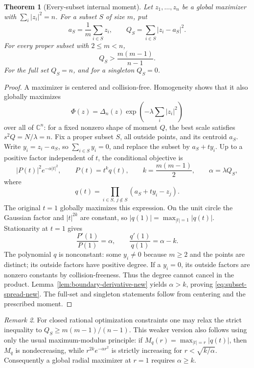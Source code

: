 \documentclass[11pt]{article}
\newtheorem{theorem}{Theorem}[section]
\theoremstyle{remark}
\newtheorem{remark}[theorem]{Remark}
\newcommand{\C}{\mathbb C}
\numberwithin{equation}{section}
\begin{document}
\begin{theorem}[Every-subset internal moment]\label{thm:subset-spread-new}
Let $z_1,\ldots,z_n$ be a global maximizer with
$\sum_i|z_i|^2=n$. For a subset $S$ of size $m$, put
\[
 a_S=\frac1m\sum_{i\in S}z_i,\qquad
 Q_S=\sum_{i\in S}|z_i-a_S|^2.
\]
For every proper subset with $2\le m<n$,
\begin{equation}\label{eq:subset-spread-new}
             Q_S>\frac{m(m-1)}{n-1}.
\end{equation}
For the full set $Q_S=n$, and for a singleton $Q_S=0$.
\end{theorem}
\begin{proof}
A maximizer is centered and collision-free. Homogeneity shows that it
also globally maximizes
\[
 \Phi(z)=\Delta_n(z)\exp\left(-\lambda\sum_i|z_i|^2\right)
\]
over all of $\C^n$: for a fixed nonzero shape of moment $Q$, the best
scale satisfies $s^2Q=N/\lambda=n$.
Fix a proper subset $S$, all outside points, and its centroid $a_S$.
Write $y_i=z_i-a_S$, so $\sum_{i\in S}y_i=0$, and replace the subset
by $a_S+t y_i$. Up to a positive factor independent of $t$, the
conditional objective is
\[
 |P(t)|^2e^{-\alpha|t|^2},\qquad
 P(t)=t^k q(t),\qquad k=\frac{m(m-1)}2,\qquad
 \alpha=\lambda Q_S,
\]
where
\[
 q(t)=\prod_{i\in S,\ j\notin S}(a_S+t y_i-z_j).
\]
The original $t=1$ globally maximizes this expression. On the unit
circle the Gaussian factor and $|t|^{2k}$ are constant, so
$|q(1)|=\max_{|t|=1}|q(t)|$. Stationarity at $t=1$ gives
\[
 \frac{P'(1)}{P(1)}=\alpha,
 \qquad \frac{q'(1)}{q(1)}=\alpha-k.
\]
The polynomial $q$ is nonconstant: some $y_i\ne0$ because $m\ge2$
and the points are distinct; its outside factors have positive degree.
If a $y_i=0$, its outside factors are nonzero constants by
collision-freeness. Thus the degree cannot cancel in the product.
Lemma~\ref{lem:boundary-derivative-new} yields $\alpha>k$, proving
\eqref{eq:subset-spread-new}. The full-set and singleton statements
follow from centering and the prescribed moment.
\end{proof}

\begin{remark}
For closed rational optimization constraints one may relax the strict
inequality to $Q_S\ge m(m-1)/(n-1)$. This weaker version also follows
using only the usual maximum-modulus principle: if
$M_q(r)=\max_{|t|=r}|q(t)|$, then $M_q$ is nondecreasing, while
$r^{2k}e^{-\alpha r^2}$ is strictly increasing for
$r<\sqrt{k/\alpha}$. Consequently a global radial maximizer at $r=1$
requires $\alpha\ge k$.
\end{remark}
\end{document}
